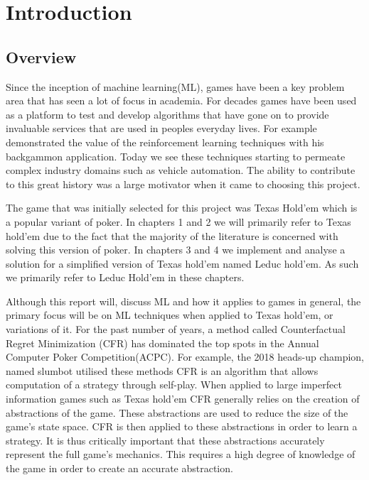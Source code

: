 \chapter{Introduction}
\label{ch:intro}

\section{Overview}\label{sec:overview}
Since the inception of machine learning(ML), games have been a key problem area that has seen a lot of focus
in academia.
For decades games have been used as a platform to test and develop algorithms that have gone on to provide invaluable
services that are used in peoples everyday lives.
For example\citep{tesauro1995td} demonstrated the value of the reinforcement learning techniques
with his backgammon application.
Today we see these techniques starting to permeate complex industry domains such as vehicle
automation\citep{desjardins2011cooperative}.
The ability to contribute to this great history was a large motivator when it came to choosing this project.

The game that was initially selected for this project was Texas Hold'em which is a popular
variant of poker.
In chapters 1 and 2 we will primarily refer to Texas hold'em due to the
fact that the majority of the literature is concerned with solving this version of poker.
In chapters 3 and 4 we implement and analyse a solution for a simplified version of Texas
hold'em named Leduc hold'em.
As such we primarily refer to Leduc Hold'em in these chapters.

Although this report will, discuss ML and how it applies to games in general, the primary
focus will be on ML techniques when applied to Texas hold'em, or variations of it.
For the past number of years, a method called Counterfactual Regret Minimization (CFR) has dominated the
top spots in the Annual Computer Poker Competition(ACPC).
For example, the 2018 heads-up champion, named slumbot utilised these methods\citep{jackson2013slumbot}
CFR is an algorithm that allows computation of a strategy through self-play\citep{zinkevich2008regret}.
When applied to large imperfect information games such as Texas hold'em CFR generally relies on the
creation of abstractions of the game.
These abstractions are used to reduce the size of the game's state space.
CFR is then applied to these abstractions in order to learn a strategy.
It is thus critically important that these abstractions accurately represent the full game's mechanics.
This requires a high degree of knowledge of the game in order to create an accurate abstraction.

